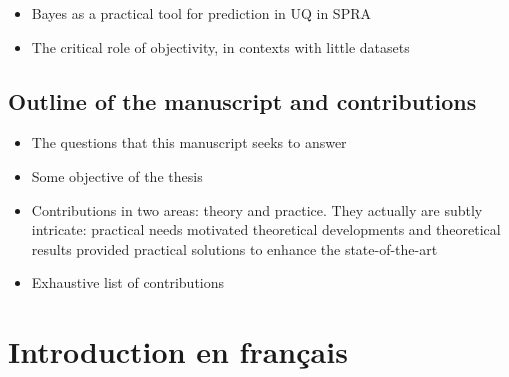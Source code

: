 










\begin{itemize}
    \item Bayes as a practical tool for prediction in UQ in SPRA
    \item The critical role of objectivity, in contexts with little datasets
\end{itemize}



\section{Outline of the manuscript and contributions}

\begin{itemize}
    \item The questions that this manuscript seeks to answer 
    \item Some objective of the thesis 
    \item Contributions in two areas: theory and practice. They actually are subtly intricate: practical needs motivated theoretical developments and theoretical results provided practical solutions to enhance the state-of-the-art
    \item Exhaustive list of contributions
\end{itemize}






\chapter{Introduction en français}

